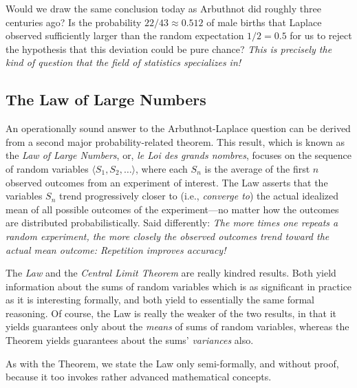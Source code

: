 \medskip

Would we draw the same conclusion today as Arbuthnot did roughly three centuries ago?  Is the probability $22/43 \approx 0.512$ of male births that Laplace observed sufficiently larger than the random expectation $1/2 = 0.5$ for us to reject the hypothesis that this deviation could be pure chance?  {\em This is precisely the kind of question that the field of statistics specializes in!}

\subsection{The Law of Large Numbers}
\label{sec:Large-Numbers}

 

An operationally sound answer to the Arbuthnot-Laplace question can be derived from a second major probability-related theorem.  This result, which is known as the {\it Law of Large Numbers}, or, {\it le Loi des grands nombres}, focuses on the sequence of random variables $\langle S_1, S_2, \ldots \rangle$, where each $S_n$ is the average of the first $n$ observed outcomes from an experiment of interest.  The Law asserts that the variables $S_n$ trend progressively closer to (i.e., {\em converge to}) the actual idealized mean of all possible outcomes of the experiment---no matter how the outcomes are distributed probabilistically.  Said differently: {\em The more times one repeats a random experiment, the more closely the observed outcomes trend toward the actual mean outcome:  Repetition improves accuracy!}

\medskip

The {\it Law} and the {\it Central Limit Theorem} are really kindred results.  Both yield information about the sums of random variables which is as significant in practice as it is interesting formally, and both yield to essentially the same formal reasoning.  Of course, the Law is really the weaker of the two results, in that it yields guarantees only about the {\em means} of sums of random variables, whereas the Theorem yields guarantees about the sums' {\em variances} also.

As with the Theorem, we state the Law only semi-formally, and without proof, because it too invokes rather advanced mathematical concepts.

\bigskip

